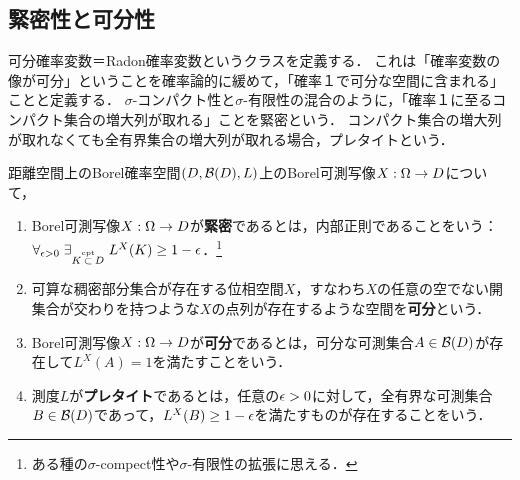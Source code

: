 \documentclass[uplatex,dvipdfmx]{jsreport}
\begin{document}
\subsection{緊密性と可分性}

\begin{tcolorbox}[colframe=ForestGreen, colback=ForestGreen!10!white,breakable,colbacktitle=ForestGreen!40!white,coltitle=black,fonttitle=\bfseries\sffamily,
title=可分・緊密な確率変数]
    可分確率変数＝Radon確率変数というクラスを定義する．
    これは「確率変数の像が可分」ということを確率論的に緩めて，「確率１で可分な空間に含まれる」ことと定義する．
    $\sigma$-コンパクト性と$\sigma$-有限性の混合のように，「確率１に至るコンパクト集合の増大列が取れる」ことを緊密という．
    コンパクト集合の増大列が取れなくても全有界集合の増大列が取れる場合，プレタイトという．
\end{tcolorbox}

\begin{definition}
    距離空間上のBorel確率空間$(D,\mathcal{B}(D),L)$上のBorel可測写像$X:\Omega\to D$について，
    \begin{enumerate}
        \item Borel可測写像$X:\Omega\to D$が\textbf{緊密}であるとは，内部正則であることをいう：$\forall_{\epsilon>0}\;\exists_{K\overset{\textrm{cpt}}{\subset} D}\;L^X(K)\ge 1-\epsilon$．\footnote{ある種の$\sigma$-compect性や$\sigma$-有限性の拡張に思える．}
        \item 可算な稠密部分集合が存在する位相空間$X$，すなわち$X$の任意の空でない開集合が交わりを持つような$X$の点列が存在するような空間を\textbf{可分}という．
        \item Borel可測写像$X:\Omega\to D$が\textbf{可分}であるとは，可分な可測集合$A\in\mathcal{B}(D)$が存在して$L^X(A)=1$を満たすことをいう．
        \item 測度$L$が\textbf{プレタイト}であるとは，任意の$\epsilon>0$に対して，全有界な可測集合$B\in\mathcal{B}(D)$であって，$L^X(B)\ge 1-\epsilon$を満たすものが存在することをいう．
    \end{enumerate}
\end{definition}
\end{document}

